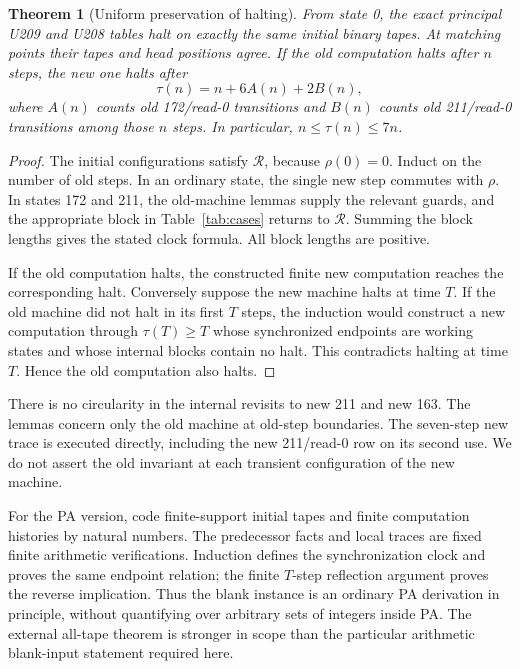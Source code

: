 \documentclass[11pt,letterpaper]{article}
\newtheorem{theorem}{Theorem}[section]
\begin{document}
\begin{theorem}[Uniform preservation of halting]
\label{thm:all-tape}
From state 0, the exact principal U209 and U208 tables halt on exactly
the same initial binary tapes. At matching points their tapes and head
positions agree. If the old computation halts after \(n\) steps, the new
one halts after
\[
\tau(n)=n+6A(n)+2B(n),
\]
where \(A(n)\) counts old 172/read-0 transitions and \(B(n)\) counts old
211/read-0 transitions among those \(n\) steps. In particular,
\(n\le\tau(n)\le7n\).
\end{theorem}
\begin{proof}
The initial configurations satisfy \(\mathcal R\), because \(\rho(0)=0\).
Induct on the number of old steps. In an ordinary state, the single new
step commutes with \(\rho\). In states 172 and 211, the old-machine
lemmas supply the relevant guards, and the appropriate block in
Table~\ref{tab:cases} returns to \(\mathcal R\). Summing the block
lengths gives the stated clock formula. All block lengths are positive.

If the old computation halts, the constructed finite new computation
reaches the corresponding halt. Conversely suppose the new machine
halts at time \(T\). If the old machine did not halt in its first \(T\)
steps, the induction would construct a new computation through
\(\tau(T)\ge T\) whose synchronized endpoints are working states and
whose internal blocks contain no halt. This contradicts halting at time
\(T\). Hence the old computation also halts.
\end{proof}

There is no circularity in the internal revisits to new 211 and new 163.
The lemmas concern only the old machine at old-step boundaries. The
seven-step new trace is executed directly, including the new 211/read-0
row on its second use. We do not assert the old invariant at each
transient configuration of the new machine.

For the PA version, code finite-support initial tapes and finite computation
histories by natural numbers. The predecessor facts and local traces are
fixed finite arithmetic verifications. Induction defines the synchronization
clock and proves the same endpoint relation; the finite \(T\)-step
reflection argument proves the reverse implication. Thus the blank instance
is an ordinary PA derivation in principle, without quantifying over arbitrary
sets of integers inside PA. The external all-tape theorem is stronger in
scope than the particular arithmetic blank-input statement required here.
\end{document}
